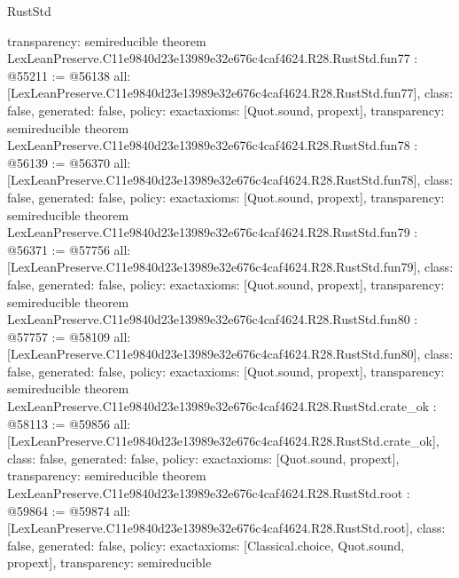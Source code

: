 \begin{lexlean}{RustStd}
\begin{coremodule}
{  transparency: semireducible
}
theorem LexLeanPreserve.C11e9840d23e13989e32e676c4caf4624.R28.RustStd.fun77 : @55211 := @56138 {
  all: [LexLeanPreserve.C11e9840d23e13989e32e676c4caf4624.R28.RustStd.fun77],
  class: false,
  generated: false,
  policy: exact{axioms: [Quot.sound, propext]},
  transparency: semireducible
}
theorem LexLeanPreserve.C11e9840d23e13989e32e676c4caf4624.R28.RustStd.fun78 : @56139 := @56370 {
  all: [LexLeanPreserve.C11e9840d23e13989e32e676c4caf4624.R28.RustStd.fun78],
  class: false,
  generated: false,
  policy: exact{axioms: [Quot.sound, propext]},
  transparency: semireducible
}
theorem LexLeanPreserve.C11e9840d23e13989e32e676c4caf4624.R28.RustStd.fun79 : @56371 := @57756 {
  all: [LexLeanPreserve.C11e9840d23e13989e32e676c4caf4624.R28.RustStd.fun79],
  class: false,
  generated: false,
  policy: exact{axioms: [Quot.sound, propext]},
  transparency: semireducible
}
theorem LexLeanPreserve.C11e9840d23e13989e32e676c4caf4624.R28.RustStd.fun80 : @57757 := @58109 {
  all: [LexLeanPreserve.C11e9840d23e13989e32e676c4caf4624.R28.RustStd.fun80],
  class: false,
  generated: false,
  policy: exact{axioms: [Quot.sound, propext]},
  transparency: semireducible
}
theorem LexLeanPreserve.C11e9840d23e13989e32e676c4caf4624.R28.RustStd.crate_ok : @58113 := @59856 {
  all: [LexLeanPreserve.C11e9840d23e13989e32e676c4caf4624.R28.RustStd.crate_ok],
  class: false,
  generated: false,
  policy: exact{axioms: [Quot.sound, propext]},
  transparency: semireducible
}
theorem LexLeanPreserve.C11e9840d23e13989e32e676c4caf4624.R28.RustStd.root : @59864 := @59874 {
  all: [LexLeanPreserve.C11e9840d23e13989e32e676c4caf4624.R28.RustStd.root],
  class: false,
  generated: false,
  policy: exact{axioms: [Classical.choice, Quot.sound, propext]},
  transparency: semireducible
}


\end{coremodule}
\end{lexlean}
